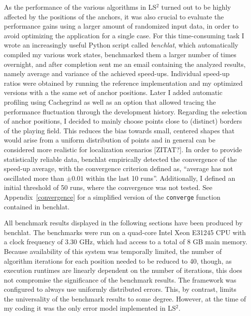 As the performance of the various algorithms in LS$^{2}$ turned out to be highly affected by the positions of the anchors, it was also crucial to evaluate the performance gains using a larger amount of randomized input data, in order to avoid optimizing the application for a single case. For this time-consuming task I wrote an increasingly useful Python script called \emph{benchlat}, which automatically compiled my various work states, benchmarked them a larger number of times overnight, and after completion sent me an email containing the analyzed results, namely average and variance of the achieved speed-ups. Individual speed-up ratios were obtained by running the reference implementation and my optimized versions with a the same set of anchor positions. Later I added automatic profiling using Cachegrind as well as an option that allowed tracing the performance fluctuation through the development history. Regarding the selection of anchor positions, I decided to mainly choose points close to (distinct) borders of the playing field. This reduces the bias towards small, centered shapes that would arise from a uniform distribution of points and in general can be considered more realistic for localization scenarios [ZITAT?]. In order to provide statistically reliable data, benchlat empirically detected the convergence of the speed-up average, with the convergence criterion defined as, ``average has not oscillated more than $\pm0.01$ within the last 10 runs''. Additionally, I defined an initial threshold of 50 runs, where the convergence was not tested. See Appendix~\ref{convergence} for a simplified version of the \texttt{converge} function contained in benchlat.

All benchmark results displayed in the following sections have been produced by benchlat. The benchmarks were run on a quad-core Intel Xeon E31245 CPU with a clock frequency of 3.30 GHz, which had access to a total of 8 GB main memory. Because availability of this system was temporally limited, the number of algorithm iterations for each position needed to be reduced to 40, though, as execution runtimes are linearly dependent on the number of iterations, this does not compromise the significance of the benchmark results. The framework was configured to always use uniformly distributed errors. This, by contrast, limits the universality of the benchmark results to some degree. However, at the time of my coding it was the only error model implemented in LS$^{2}$.

